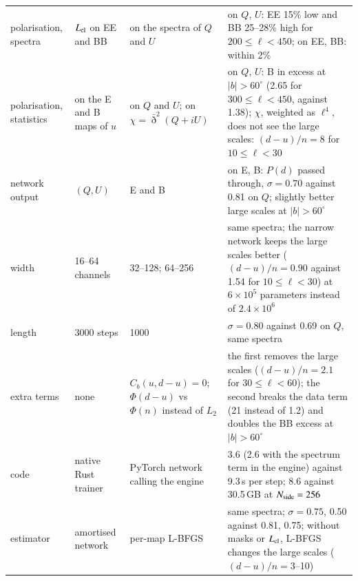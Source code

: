 \documentclass{aa}
\newcommand{\nside}{N_{\rm side}}
\begin{document}
\begin{table}
\begin{tabular}{p{2.6cm}p{3.3cm}p{4.2cm}p{6.6cm}}
    polarisation, spectra & $L_{\rm cl}$ on EE and BB & on the spectra of $Q$ and $U$ & on $Q$, $U$: EE 15\% low and BB 25--28\% high for $200\le\ell<450$; on EE, BB: within 2\% \\
    polarisation, statistics & on the E and B maps of $u$ & on $Q$ and $U$; on $\chi=\bar\eth^2(Q+iU)$ & on $Q$, $U$: B in excess at $|b|>60^\circ$ (2.65 for $300\le\ell<450$, against 1.38); $\chi$, weighted as $\ell^4$, does not see the large scales: $(d-u)/n=8$ for $10\le\ell<30$ \\
    network output & $(Q,U)$ & E and B & on E, B: $P(d)$ passed through, $\sigma=0.70$ against 0.81 on $Q$; slightly better large scales at $|b|>60^\circ$ \\
    width & 16--64 channels & 32--128; 64--256 & same spectra; the narrow network keeps the large scales better ($(d-u)/n=0.90$ against 1.54 for $10\le\ell<30$) at $6\times10^5$ parameters instead of $2.4\times10^6$ \\
    length & 3000 steps & 1000 & $\sigma=0.80$ against 0.69 on $Q$, same spectra \\
    extra terms & none & $C_b(u,d-u)=0$; $\Phi(d-u)$ vs $\Phi(n)$ instead of $L_2$ & the first removes the large scales ($(d-u)/n=2.1$ for $30\le\ell<60$); the second breaks the data term (21 instead of 1.2) and doubles the BB excess at $|b|>60^\circ$ \\
    code & native Rust trainer & PyTorch network calling the engine & 3.6 (2.6 with the spectrum term in the engine) against 9.3\,s per step; 8.6 against 30.5\,GB at $\nside=256$ \\
    estimator & amortised network & per-map L-BFGS & same spectra; $\sigma=0.75$, 0.50 against 0.81, 0.75; without masks or $L_{\rm cl}$, L-BFGS changes the large scales ($(d-u)/n=3$--10) \\
    \hline
  \end{tabular}
\end{table}
\end{document}
